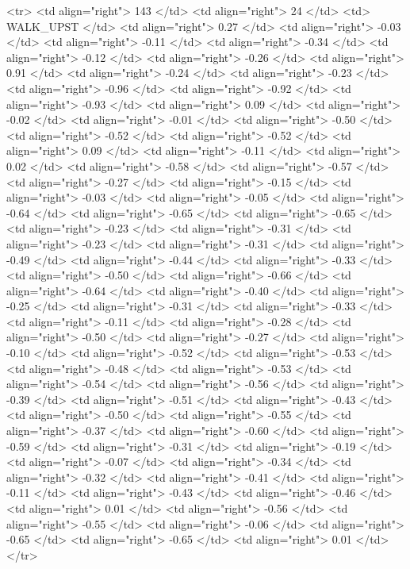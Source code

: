   <tr> <td align="right"> 143 </td> <td align="right">  24 </td> <td> WALK_UPST </td> <td align="right"> 0.27 </td> <td align="right"> -0.03 </td> <td align="right"> -0.11 </td> <td align="right"> -0.34 </td> <td align="right"> -0.12 </td> <td align="right"> -0.26 </td> <td align="right"> 0.91 </td> <td align="right"> -0.24 </td> <td align="right"> -0.23 </td> <td align="right"> -0.96 </td> <td align="right"> -0.92 </td> <td align="right"> -0.93 </td> <td align="right"> 0.09 </td> <td align="right"> -0.02 </td> <td align="right"> -0.01 </td> <td align="right"> -0.50 </td> <td align="right"> -0.52 </td> <td align="right"> -0.52 </td> <td align="right"> 0.09 </td> <td align="right"> -0.11 </td> <td align="right"> 0.02 </td> <td align="right"> -0.58 </td> <td align="right"> -0.57 </td> <td align="right"> -0.27 </td> <td align="right"> -0.15 </td> <td align="right"> -0.03 </td> <td align="right"> -0.05 </td> <td align="right"> -0.64 </td> <td align="right"> -0.65 </td> <td align="right"> -0.65 </td> <td align="right"> -0.23 </td> <td align="right"> -0.31 </td> <td align="right"> -0.23 </td> <td align="right"> -0.31 </td> <td align="right"> -0.49 </td> <td align="right"> -0.44 </td> <td align="right"> -0.33 </td> <td align="right"> -0.50 </td> <td align="right"> -0.66 </td> <td align="right"> -0.64 </td> <td align="right"> -0.40 </td> <td align="right"> -0.25 </td> <td align="right"> -0.31 </td> <td align="right"> -0.33 </td> <td align="right"> -0.11 </td> <td align="right"> -0.28 </td> <td align="right"> -0.50 </td> <td align="right"> -0.27 </td> <td align="right"> -0.10 </td> <td align="right"> -0.52 </td> <td align="right"> -0.53 </td> <td align="right"> -0.48 </td> <td align="right"> -0.53 </td> <td align="right"> -0.54 </td> <td align="right"> -0.56 </td> <td align="right"> -0.39 </td> <td align="right"> -0.51 </td> <td align="right"> -0.43 </td> <td align="right"> -0.50 </td> <td align="right"> -0.55 </td> <td align="right"> -0.37 </td> <td align="right"> -0.60 </td> <td align="right"> -0.59 </td> <td align="right"> -0.31 </td> <td align="right"> -0.19 </td> <td align="right"> -0.07 </td> <td align="right"> -0.34 </td> <td align="right"> -0.32 </td> <td align="right"> -0.41 </td> <td align="right"> -0.11 </td> <td align="right"> -0.43 </td> <td align="right"> -0.46 </td> <td align="right"> 0.01 </td> <td align="right"> -0.56 </td> <td align="right"> -0.55 </td> <td align="right"> -0.06 </td> <td align="right"> -0.65 </td> <td align="right"> -0.65 </td> <td align="right"> 0.01 </td> </tr>
